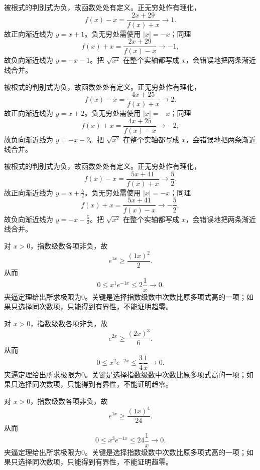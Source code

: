 \documentclass[UTF8,12pt,a4paper,fontset=fandol]{ctexart}
\begin{document}
\begin{solve}\label{ans:c4q4}
被根式的判别式为负，故函数处处有定义。正无穷处作有理化，
\[
f(x)-x=\frac{2x+29}{f(x)+x}\longrightarrow 1.
\]
故正向渐近线为 $y=x+1$。负无穷处需使用 $|x|=-x$；同理
\[
f(x)+x=\frac{2x+29}{f(x)-x}\longrightarrow-1,
\]
故负向渐近线为 $y=-x-1$。把 $\sqrt{x^2}$ 在整个实轴都写成 $x$，会错误地把两条渐近线合并。
\end{solve}

\begin{solve}\label{ans:c4q5}
被根式的判别式为负，故函数处处有定义。正无穷处作有理化，
\[
f(x)-x=\frac{4x+25}{f(x)+x}\longrightarrow 2.
\]
故正向渐近线为 $y=x+2$。负无穷处需使用 $|x|=-x$；同理
\[
f(x)+x=\frac{4x+25}{f(x)-x}\longrightarrow-2,
\]
故负向渐近线为 $y=-x-2$。把 $\sqrt{x^2}$ 在整个实轴都写成 $x$，会错误地把两条渐近线合并。
\end{solve}

\begin{solve}\label{ans:c4q6}
被根式的判别式为负，故函数处处有定义。正无穷处作有理化，
\[
f(x)-x=\frac{5x+41}{f(x)+x}\longrightarrow \frac{5}{2}.
\]
故正向渐近线为 $y=x+\frac{5}{2}$。负无穷处需使用 $|x|=-x$；同理
\[
f(x)+x=\frac{5x+41}{f(x)-x}\longrightarrow-\frac{5}{2},
\]
故负向渐近线为 $y=-x-\frac{5}{2}$。把 $\sqrt{x^2}$ 在整个实轴都写成 $x$，会错误地把两条渐近线合并。
\end{solve}

\begin{solve}\label{ans:c4q7}
对 $x>0$，指数级数各项非负，故
\[
e^{1x}\ge\frac{(1x)^{2}}{2}.
\]
从而
\[
0\le x^{1}e^{-1x}\le 2\frac1x\longrightarrow0.
\]
夹逼定理给出所求极限为0。关键是选择指数级数中次数比原多项式高的一项；如果只选择同次数项，只能得到有界性，不能证明趋零。
\end{solve}

\begin{solve}\label{ans:c4q8}
对 $x>0$，指数级数各项非负，故
\[
e^{2x}\ge\frac{(2x)^{3}}{6}.
\]
从而
\[
0\le x^{2}e^{-2x}\le \frac{3}{4}\frac1x\longrightarrow0.
\]
夹逼定理给出所求极限为0。关键是选择指数级数中次数比原多项式高的一项；如果只选择同次数项，只能得到有界性，不能证明趋零。
\end{solve}

\begin{solve}\label{ans:c4q9}
对 $x>0$，指数级数各项非负，故
\[
e^{1x}\ge\frac{(1x)^{4}}{24}.
\]
从而
\[
0\le x^{3}e^{-1x}\le 24\frac1x\longrightarrow0.
\]
夹逼定理给出所求极限为0。关键是选择指数级数中次数比原多项式高的一项；如果只选择同次数项，只能得到有界性，不能证明趋零。
\end{solve}
\end{document}
